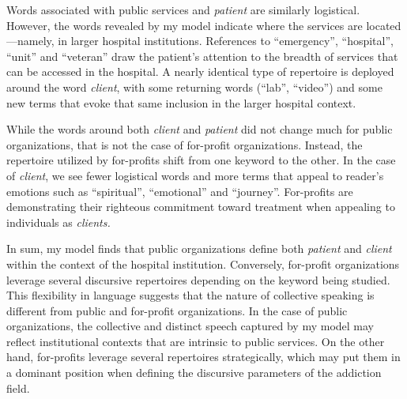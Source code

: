 \documentclass[
  12pt,
]{article}
\begin{document}
\vspace{12pt}

Words associated with public services and \emph{patient} are similarly logistical. However, the words revealed by my model indicate where the services are located---namely, in larger hospital institutions. References to ``emergency'', ``hospital'', ``unit'' and ``veteran'' draw the patient's attention to the breadth of services that can be accessed in the hospital. A nearly identical type of repertoire is deployed around the word \emph{client}, with some returning words (``lab'', ``video'') and some new terms that evoke that same inclusion in the larger hospital context.

\vspace{12pt}

While the words around both \emph{client} and \emph{patient} did not change much for public organizations, that is not the case of for-profit organizations. Instead, the repertoire utilized by for-profits shift from one keyword to the other. In the case of \emph{client}, we see fewer logistical words and more terms that appeal to reader's emotions such as ``spiritual'', ``emotional'' and ``journey''. For-profits are demonstrating their righteous commitment toward treatment when appealing to individuals as \emph{clients.}

\vspace{12pt}

In sum, my model finds that public organizations define both \emph{patient} and \emph{client} within the context of the hospital institution. Conversely, for-profit organizations leverage several discursive repertoires depending on the keyword being studied. This flexibility in language suggests that the nature of collective speaking is different from public and for-profit organizations. In the case of public organizations, the collective and distinct speech captured by my model may reflect institutional contexts that are intrinsic to public services. On the other hand, for-profits leverage several repertoires strategically, which may put them in a dominant position when defining the discursive parameters of the addiction field.
\end{document}
